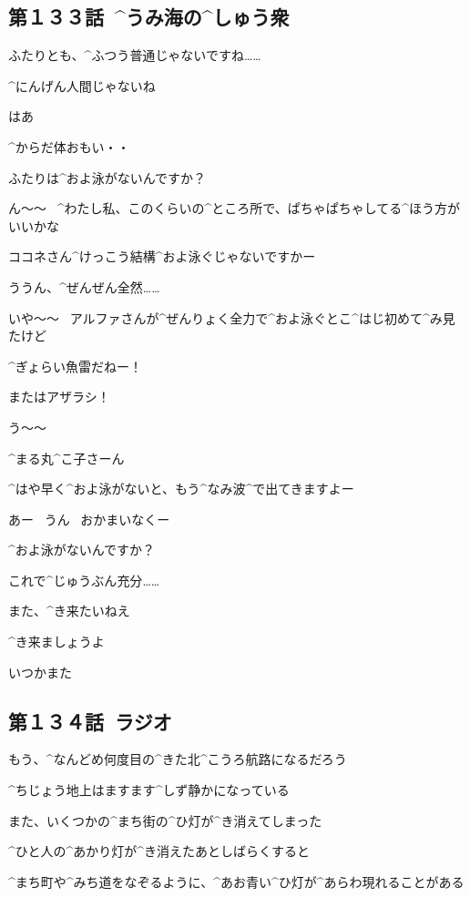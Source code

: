\subsection{第１３３話\ ^{うみ}{海}の^{しゅう}{衆}}

\page[36]
\K ふたりとも、^{ふつう}{普通}じゃないですね……

\R ^{にんげん}{人間}じゃないね

\page
\A はあ

\A ^{からだ}{体}おもい・・

\M ふたりは^{およ}{泳}がないんですか？

\K ん〜〜
\ ^{わたし}{私}、このくらいの^{ところ}{所}で、ぱちゃぱちゃしてる^{ほう}{方}がいいかな

\M ココネさん^{けっこう}{結構}^{およ}{泳}ぐじゃないですかー

\K ううん、^{ぜんぜん}{全然}……

\M いや〜〜
\ アルファさんが^{ぜんりょく}{全力}で^{およ}{泳}ぐとこ^{はじ}{初}めて^{み}{見}たけど

\M ^{ぎょらい}{魚雷}だねー！

\page
\M またはアザラシ！

\K う〜〜

\M ^{まる}{丸}^{こ}{子}さーん

\M ^{はや}{早}く^{およ}{泳}がないと、もう^{なみ}{波}^{で}{出}てきますよー

\R あー
\ うん
\ おかまいなくー

\page
\M ^{およ}{泳}がないんですか？

\R これで^{じゅうぶん}{充分}……

\page
\R また、^{き}{来}たいねえ

\M ^{き}{来}ましょうよ

\M いつかまた


\subsection{第１３４話\ ラジオ}

\page[46]
\AM もう、^{なんどめ}{何度目}の^{きた}{北}^{こうろ}{航路}になるだろう

\AM ^{ちじょう}{地上}はますます^{しず}{静}かになっている

\page
\AM また、いくつかの^{まち}{街}の^{ひ}{灯}が^{き}{消}えてしまった

\AM ^{ひと}{人}の^{あかり}{灯}が^{き}{消}えたあとしばらくすると

\AM ^{まち}{町}や^{みち}{道}をなぞるように、^{あお}{青}い^{ひ}{灯}が^{あらわ}{現}れることがある

